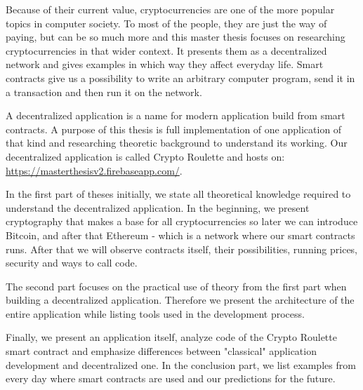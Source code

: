 \documentclass[a4paper,oneside,12pt]{memoir} %
\begin{document}
\begin{summary}
Because of their current value, cryptocurrencies are one of the more popular topics in computer society. To most of the people, they are just the way of paying, but can be so much more and this master thesis focuses on researching cryptocurrencies in that wider context. It presents them as a decentralized network and gives examples in which way they affect everyday life. Smart contracts give us a possibility to write an arbitrary computer program, send it in a transaction and then run it on the network.

A decentralized application is a name for modern application build from smart contracts. A purpose of this thesis is full implementation of one application of that kind and researching theoretic background to understand its working. Our decentralized application is called Crypto Roulette and hosts on: \url{https://masterthesisv2.firebaseapp.com/}.

In the first part of theses initially, we state all theoretical knowledge required to understand the decentralized application. In the beginning, we present cryptography that makes a base for all cryptocurrencies so later we can introduce Bitcoin, and after that Ethereum - which is a network where our smart contracts runs. After that we will observe contracts itself, their possibilities, running prices, security and ways to call code.

The second part focuses on the practical use of theory from the first part when building a decentralized application. Therefore we present the architecture of the entire application while listing tools used in the development process.

Finally, we present an application itself, analyze code of the Crypto Roulette smart contract and emphasize differences between "classical" application development and decentralized one. In the conclusion part, we list examples from every day where smart contracts are used and our predictions for the future.
\end{summary}

\end{document}
